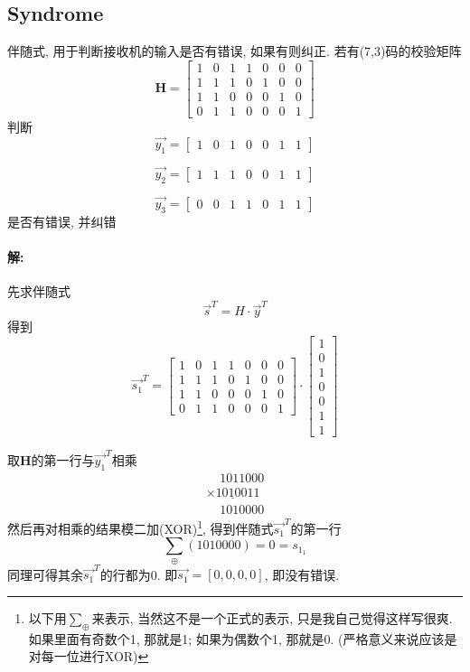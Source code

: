 \documentclass[a4paper]{report}
\begin{document}
\subsection{Syndrome}
伴随式, 用于判断接收机的输入是否有错误, 如果有则纠正. 若有(7,3)码的校验矩阵
\[
  \textbf{H}=
    \begin{bmatrix}
    1&0&1&1&0&0&0\\
    1&1&1&0&1&0&0\\
    1&1&0&0&0&1&0\\
    0&1&1&0&0&0&1
  \end{bmatrix}
\]
判断
\[
  \vec{y_1}=
  \begin{bmatrix}
    1&0&1&0&0&1&1
  \end{bmatrix}
  \]

  \[
  \vec{y_2}=
  \begin{bmatrix}
    1&1&1&0&0&1&1
  \end{bmatrix}
\]

  \[
  \vec{y_3}=
  \begin{bmatrix}
    0&0&1&1&0&1&1
  \end{bmatrix}
  \]
是否有错误, 并纠错

\paragraph{解: }先求伴随式
$$\vec{s}^T=H\cdot \vec{y}^T$$得到
\[
  \vec{s_1}^T=
      \begin{bmatrix}
    1&0&1&1&0&0&0\\
    1&1&1&0&1&0&0\\
    1&1&0&0&0&1&0\\
    0&1&1&0&0&0&1
  \end{bmatrix}\cdot 
    \begin{bmatrix}
    1\\0\\1\\0\\0\\1\\1
  \end{bmatrix}
\]

取$\textbf{H}$的第一行与$\vec{y_1}^T$相乘
\begin{equation*}\begin{array}{c}
\phantom{\times}1011000\\
\underline{\times1010011}\\
\phantom\times 1010000
\end{array}\end{equation*}
然后再对相乘的结果模二加(XOR)\footnote{以下用$\sum_\oplus$来表示, 当然这不是一个正式的表示, 只是我自己觉得这样写很爽. 如果里面有奇数个1, 那就是1; 如果为偶数个1, 那就是0. (严格意义来说应该是对每一位进行XOR)}, 得到伴随式$\vec{s_1}^T$的第一行
$$\displaystyle\sum_{\oplus}(1010000)=0=s_{1_1}$$
同理可得其余$\vec{s_1}^T$的行都为0. 即$\vec{s_1}=[0,0,0,0]$, 即没有错误. 
\end{document}
